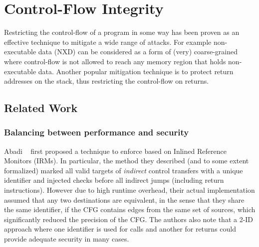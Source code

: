 \chapter{Control-Flow Integrity}\label{ch:cfi}



Restricting the control-flow of a program in some way has been proven
as an effective technique to mitigate a wide range of attacks.
For example non-executable data (NXD)
can be considered as a form of (very) coarse-grained \CFI where control-flow is
not allowed to reach any memory region that holds non-executable data. Another
popular mitigation technique is to protect return addresses on the stack,
thus restricting the control-flow on returns.


\section{Related Work}

\subsection{Balancing between performance and security}\label{sec:security_cfi}


Abadi \ETAL~\cite{abadi2005} first proposed a technique to enforce
\CFI based on Inlined Reference Monitors (IRMs). In particular, the
method they described (and to some extent formalized) marked all valid
targets of \emph{indirect} control transfers with a unique identifier
and injected checks before all indirect jumps (including return
instructions). However due to high runtime overhead, their actual
implementation assumed that any two destinations are equivalent, in
the sense that they share the same identifier, if the CFG contains
edges from the same set of sources, which significantly reduced the
precision of the CFG. The authors also note that a 2-ID approach where
one identifier is used for calls and another for returns could provide
adequate security in many cases.

